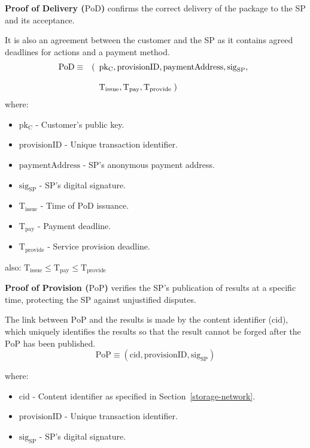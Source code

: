 \documentclass[pdftex,twocolumn,epjc3]{svjour3}
\begin{document}
\noindent \textbf{Proof of Delivery ($\mathrm{PoD}$)}\label{proof-of-delivery} confirms the correct delivery of the package to the SP and its acceptance.

It is also an agreement between the customer and the SP as it contains agreed deadlines for actions and a payment method.
\begin{eqnarray}
\mathrm{PoD} & \equiv & (\begin{array}[t]{l}\mathrm{pk_C}, \mathrm{provisionID},   \mathrm{paymentAddress},
\mathrm{sig}_\mathrm{SP}, \\\\ 
\mathrm{T}_\mathrm{issue}, \mathrm{T}_\mathrm{pay}, \mathrm{T}_\mathrm{provide}\; )\end{array}
\end{eqnarray}
where:
\begin{itemize}
\item $\mathrm{pk_C}$ - Customer's public key.
\item $\mathrm{provisionID}$ - Unique transaction identifier.
\item $\mathrm{paymentAddress}$ - SP's anonymous payment address.
\item $\mathrm{sig}_\mathrm{SP}$ - SP's digital signature.
\item $\mathrm{T}_\mathrm{issue}$ - Time of $\mathrm{PoD}$ issuance.
\item $\mathrm{T}_\mathrm{pay}$ - Payment deadline.
\item $\mathrm{T}_\mathrm{provide}$ - Service provision deadline.
\end{itemize}

also:
\(\mathrm{T}_\mathrm{issue} \leq \mathrm{T}_\mathrm{pay} \leq \mathrm{T}_\mathrm{provide}\)

\noindent \textbf{Proof of Provision ($\mathrm{PoP}$)}\label{proof-of-provision} verifies the SP's publication of results at a specific time, protecting the SP against unjustified disputes.

The link between $\mathrm{PoP}$ and the results is made by the content identifier ($\mathrm{cid}$), which uniquely identifies the results so that the result cannot be forged after the $\mathrm{PoP}$ has been published.
\begin{equation}
\mathrm{PoP} \equiv (\mathrm{cid}, \mathrm{provisionID}, \mathrm{sig}_\mathrm{SP})
\end{equation}

where:
\begin{itemize}
\item $\mathrm{cid}$ - Content identifier as specified in Section~\ref{storage-network}.
\item $\mathrm{provisionID}$ - Unique transaction identifier.
\item $\mathrm{sig}_\mathrm{SP}$ - SP's digital signature.
\end{itemize}
\end{document}
